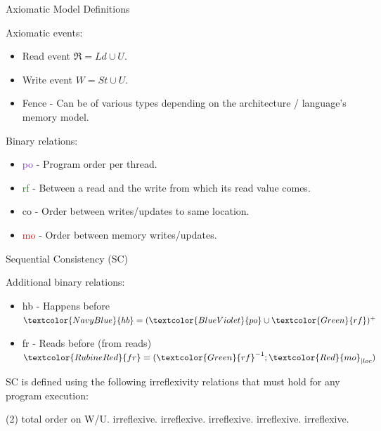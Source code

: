 \documentclass[xcolor={dvipsnames}, notes]{beamer}
\newcommand{\po}{\textcolor{BlueViolet}{po}}
\newcommand{\rf}{\textcolor{Green}{rf}}
\newcommand{\co}{\textcolor{BurntOrange}{co}}
\newcommand{\mo}{\textcolor{Red}{mo}}
\newcommand{\hb}{\textcolor{NavyBlue}{hb}}
\newcommand{\fr}{\textcolor{RubineRed}{fr}}
\begin{document}
    \begin{frame}{Axiomatic Model Definitions}

        Axiomatic events:
        \begin{itemize}
            \item Read event $\Re = Ld \cup U$.
            \item Write event $W = St \cup U$. 
            \item Fence - Can be of various types depending on the architecture / language's memory model.
        \end{itemize}

        Binary relations:
        \begin{itemize}
            \item {\po} - Program order per thread.
            \item {\rf} - Between a read and the write from which its read value comes.
            \item {\co} - Order between writes/updates to same location.
            \item {\mo} - Order between memory writes/updates.
        \end{itemize}

    \end{frame}

    \begin{frame}{Sequential Consistency (SC)}
        
        Additional binary relations:
        \begin{itemize}
            \item {\hb} - Happens before $ \hb = (\po \cup \rf)^{+} $
            \item {\fr} - Reads before (from reads) $ \fr = (\rf^{-1};\mo_{|loc}) $ 
        \end{itemize}

        SC is defined using the following irreflexivity relations that must hold for any program execution:
        \begin{tasks}(2)
            \task {\mo} total order on W/U.
            \task {\hb} irreflexive.
            \task {\mo;\hb} irreflexive.
            \task {\fr;\hb} irreflexive.
            \task {\fr;\mo} irreflexive.
            \task {\fr;\mo;\hb} irreflexive.
        \end{tasks}

    \end{frame}
\end{document}
